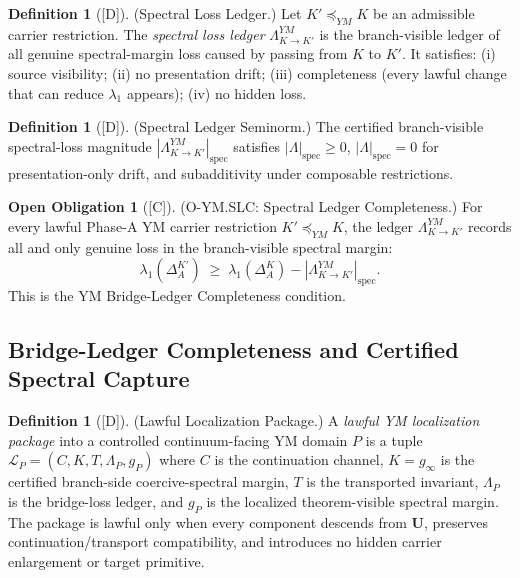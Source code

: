 \documentclass[12pt,oneside]{amsbook}
\theoremstyle{plain}
\theoremstyle{definition}
\newtheorem{definition}[theorem]{Definition}
\newtheorem{obligation}[theorem]{Open Obligation}
\theoremstyle{remark}
\newcommand{\status}[1]{\textup{[#1]}}
\begin{document}
\begin{definition}[\status{D}]\label{def:YM-spectral-loss-ledger}
\textup{(Spectral Loss Ledger.)}
Let $K' \preceq_{YM} K$ be an admissible carrier restriction. The
\emph{spectral loss ledger} $\Lambda_{K \to K'}^{YM}$ is the
branch-visible ledger of all genuine spectral-margin loss caused by
passing from $K$ to $K'$.
It satisfies: (i) source visibility; (ii) no presentation drift;
(iii) completeness (every lawful change that can reduce $\lambda_1$
appears); (iv) no hidden loss.
\end{definition}

\begin{definition}[\status{D}]\label{def:YM-spectral-ledger-seminorm}
\textup{(Spectral Ledger Seminorm.)}
The certified branch-visible spectral-loss magnitude
$|\Lambda_{K \to K'}^{YM}|_{\mathrm{spec}}$
satisfies
$|\Lambda|_{\mathrm{spec}} \ge 0$,
$|\Lambda|_{\mathrm{spec}} = 0$ for presentation-only drift,
and subadditivity under composable restrictions.
\end{definition}

\begin{obligation}[\status{C}]\label{ob:O-YM-SLC}
\textup{(O-YM.SLC: Spectral Ledger Completeness.)}
For every lawful Phase-A YM carrier restriction $K' \preceq_{YM} K$,
the ledger $\Lambda_{K \to K'}^{YM}$ records all and only genuine
loss in the branch-visible spectral margin:
\[
 \lambda_1(\Delta_A^{K'})
 \;\ge\;
 \lambda_1(\Delta_A^K) - |\Lambda_{K \to K'}^{YM}|_{\mathrm{spec}}.
\]
This is the YM Bridge-Ledger Completeness condition.
\end{obligation}

\subsection{Bridge-Ledger Completeness and Certified Spectral Capture}

\begin{definition}[\status{D}]\label{def:YM-localization-package}
\textup{(Lawful Localization Package.)}
A \emph{lawful YM localization package} into a controlled
continuum-facing YM domain $P$ is a tuple
$\mathcal{L}_P = (C, K, T, \Lambda_P, g_P)$
where $C$ is the continuation channel, $K = g_\infty$ is the
certified branch-side coercive-spectral margin, $T$ is the
transported invariant, $\Lambda_P$ is the bridge-loss ledger, and
$g_P$ is the localized theorem-visible spectral margin.
The package is lawful only when every component descends from
$\mathbf{U}$, preserves continuation/transport compatibility, and
introduces no hidden carrier enlargement or target primitive.
\end{definition}
\end{document}
